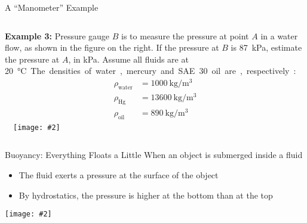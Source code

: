 \documentclass[12pt,aspectratio=169]{beamer}
\newcommand{\pic}[2]{\texttt{[image: \#2]}}
\begin{document}
\begin{frame}{A ``Manometer'' Example}
  \begin{columns}
    \textbf{Example 3:} Pressure gauge $B$ is to measure the pressure at point
    $A$ in a water flow, as shown in the figure on the right. If the pressure at
    $B$ is \SI{87}{\kilo\pascal}, estimate the pressure at $A$, in
    \si{\kilo\pascal}. Assume all fluids are at \SI{20}\celsius. The densities
    of water, mercury and SAE 30 oil are, respectively:

    \vspace{-.3in}
    \begin{align*}
      \rho_\text{water}&=\SI{1000}{\kilo\gram\per\metre^3}\\
      \rho_\text{Hg}&=\SI{13600}{\kilo\gram\per\metre^3}\\
      \rho_\text{oil}&=\SI{890}{\kilo\gram\per\metre^3}
    \end{align*}
    
    \pic{1}{mano}
  \end{columns}
\end{frame}



%
%    



\begin{frame}{Buoyancy: Everything Floats a Little}
  When an object is submerged inside a fluid
  \begin{itemize}
  \item The fluid exerts a pressure at the surface of the object
  \item By hydrostatics, the pressure is higher at the bottom than at the top
  \end{itemize}
  \begin{center}
    \pic{.3}{rock_fbvectors}
  \end{center}
\end{frame}
\end{document}
